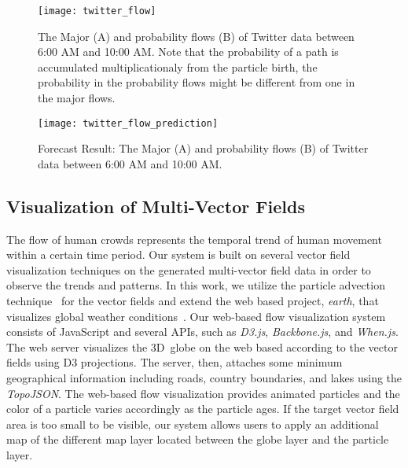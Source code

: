 \begin{figure}[tb]
	\centering
	\texttt{[image: twitter\_flow]}
	\caption{The Major (A) and probability flows (B) of Twitter data between 6:00 AM and 10:00 AM. Note that the probability of a path is accumulated multiplicationaly from the particle birth, the probability in the probability flows might be different from one in the major flows.}
	\label{fig:twitter_flow}
\end{figure}

\begin{figure}[tb]
	\centering
	\texttt{[image: twitter\_flow\_prediction]}
	\caption{Forecast Result: The Major (A) and probability flows (B) of Twitter data between 6:00 AM and 10:00 AM. }
	\label{fig:twitter_flow_prediction}
\end{figure}


\subsection{Visualization of Multi-Vector Fields}
\label{sec:forecasting-visualization}

The flow of human crowds represents the temporal trend of human movement within a certain time period. 
Our system is built on several vector field visualization techniques on the generated multi-vector field data in order to observe the trends and patterns. 
In this work, we utilize the particle advection technique~\cite{Kruger:FLOW:2005} for the vector fields and extend the web based project, {\textit{earth}}, that visualizes global weather conditions~\cite{earth:2015:online}. 
%
Our web-based flow visualization system consists of JavaScript and several APIs, such as \textit{D3.js}, \textit{Backbone.js}, and \textit{When.js}. The web server visualizes the 3D~globe on the web based according to the vector fields using D3 projections. The server, then, attaches some minimum geographical information including roads, country boundaries, and lakes using the \textit{TopoJSON}. The web-based flow visualization provides animated particles and the color of a particle varies accordingly as the particle ages. If the target vector field area is too small to be visible, our system allows users to apply an additional map of the different map layer located between the globe layer and the particle layer.


